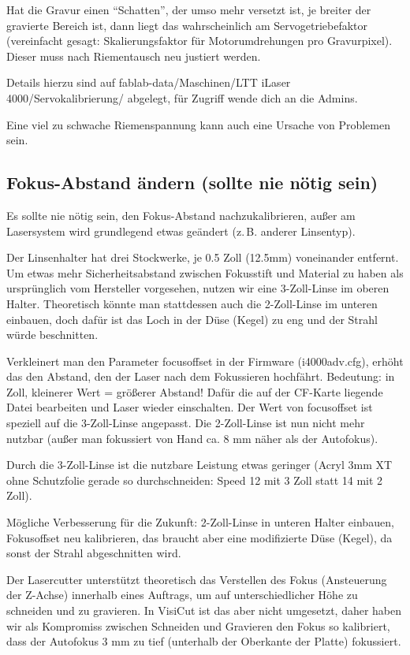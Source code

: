 \documentclass{\basedir/fablab-document}
\begin{document}
 Hat die Gravur einen \enquote{Schatten}, der umso mehr versetzt ist, je breiter der gravierte Bereich ist, dann liegt das wahrscheinlich am Servogetriebefaktor (vereinfacht gesagt: Skalierungsfaktor für Motorumdrehungen pro Gravurpixel). Dieser muss nach Riementausch neu justiert werden.

 Details hierzu sind auf fablab-data/Maschinen/LTT iLaser 4000/Servokalibrierung/ abgelegt, für Zugriff wende dich an die Admins.

  Eine viel zu schwache Riemenspannung kann auch eine Ursache von Problemen sein.

\subsection{Fokus-Abstand ändern (sollte nie nötig sein)}
	Es sollte nie nötig sein, den Fokus-Abstand nachzukalibrieren, außer am Lasersystem wird grundlegend etwas geändert (z.\,B. anderer Linsentyp).

	Der Linsenhalter hat drei \glqq Stockwerke\grqq, je 0.5 Zoll (12.5mm) voneinander entfernt. Um etwas mehr Sicherheitsabstand zwischen Fokusstift und Material zu haben als ursprünglich vom Hersteller vorgesehen, nutzen wir eine 3-Zoll-Linse im oberen Halter. Theoretisch könnte man stattdessen auch die 2-Zoll-Linse im unteren einbauen, doch dafür ist das Loch in der \glqq Düse\grqq{} (Kegel) zu eng und der Strahl würde beschnitten.

	Verkleinert man den Parameter \glqq focusoffset\grqq{} in der Firmware (i4000adv.cfg), erhöht das den Abstand, den der Laser nach dem Fokussieren hochfährt. Bedeutung: in Zoll, kleinerer Wert = größerer Abstand! Dafür die auf der CF-Karte liegende Datei bearbeiten und Laser wieder einschalten. Der Wert von focusoffset ist speziell auf die 3-Zoll-Linse angepasst. Die 2-Zoll-Linse ist nun nicht mehr nutzbar (außer man fokussiert von Hand ca. 8 mm näher als der Autofokus).

	Durch die 3-Zoll-Linse ist die nutzbare Leistung etwas geringer (Acryl 3mm XT ohne Schutzfolie gerade so durchschneiden: Speed 12 mit 3 Zoll statt 14 mit 2 Zoll).

	Mögliche Verbesserung für die Zukunft: 2-Zoll-Linse in unteren Halter einbauen, Fokusoffset neu kalibrieren, das braucht aber eine modifizierte \glqq Düse\grqq{} (Kegel), da sonst der Strahl abgeschnitten wird.

    Der Lasercutter unterstützt theoretisch das Verstellen des Fokus (Ansteuerung der Z-Achse) innerhalb eines Auftrags, um auf unterschiedlicher Höhe zu schneiden und zu gravieren. In VisiCut ist das aber nicht umgesetzt, daher haben wir als Kompromiss zwischen Schneiden und Gravieren den Fokus so kalibriert, dass der Autofokus 3 mm zu tief (unterhalb der Oberkante der Platte) fokussiert.
\end{document}
